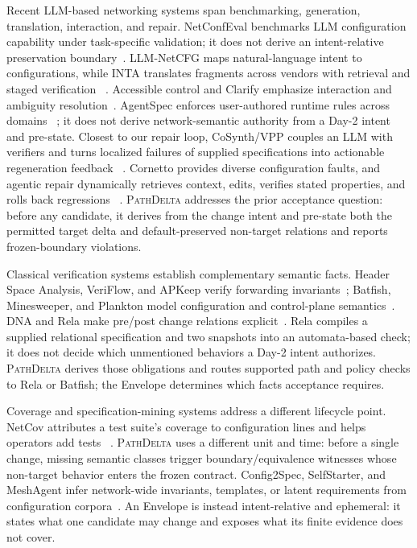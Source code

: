 \documentclass[conference]{IEEEtran}
\newcommand{\system}{\textsc{PathDelta}\xspace}
\begin{document}
Recent LLM-based networking systems span benchmarking, generation, translation,
interaction, and repair.  NetConfEval benchmarks LLM configuration capability
under task-specific validation; it does not derive an intent-relative
preservation boundary~\cite{wang2024netconfeval}.  LLM-NetCFG maps
natural-language intent to configurations, while INTA translates fragments
across vendors with retrieval and staged verification
~\cite{lira2024llmnetcfg,wei2025inta}.  Accessible control and Clarify emphasize
interaction and ambiguity resolution~\cite{lin2025accessible,mondal2025clarify}.
AgentSpec enforces user-authored runtime rules across domains
~\cite{wang2025agentspec}; it does not derive network-semantic authority from a
Day-2 intent and pre-state.  Closest to our
repair loop, CoSynth/VPP couples an LLM with verifiers and turns localized
failures of supplied specifications into actionable regeneration feedback
~\cite{mondal2023router}.  Cornetto provides diverse configuration faults, and
agentic repair dynamically retrieves context, edits, verifies stated
properties, and rolls back regressions
~\cite{protogeros2026cornetto,asadli2026agentic}.
\system addresses the prior acceptance question: before any candidate, it
derives from the change intent and pre-state both the permitted target delta and
default-preserved non-target relations and reports frozen-boundary violations.

Classical verification systems establish complementary semantic facts.  Header
Space Analysis, VeriFlow, and APKeep verify forwarding invariants~\cite{kazemian2012hsa,
khurshid2013veriflow,zhang2020apkeep}; Batfish, Minesweeper, and Plankton model
configuration and control-plane semantics~\cite{fogel2015batfish,
beckett2017minesweeper,prabhu2020plankton,brown2023batfish}.  DNA and Rela make
pre/post change relations explicit~\cite{zhang2022dna,xu2024rela}.  Rela
compiles a supplied relational specification and two snapshots into an
automata-based check; it does not decide which unmentioned behaviors a Day-2
intent authorizes.  \system derives those obligations and routes supported path
and policy checks to Rela or Batfish; the Envelope determines which facts
acceptance requires.

Coverage and specification-mining systems address a different lifecycle point.
NetCov attributes a test suite's coverage to configuration lines and helps operators add tests
~\cite{xu2023netcov}.  \system uses a different unit and time: before a single
change, missing semantic classes trigger boundary/equivalence witnesses whose
non-target behavior enters the frozen contract.  Config2Spec, SelfStarter, and
MeshAgent infer network-wide invariants, templates, or latent requirements from
configuration corpora~\cite{birkner2020config2spec,kakarla2020templates,
zhou2025meshagent}.  An Envelope is instead intent-relative and ephemeral: it
states what one candidate may change and exposes what its finite evidence does
not cover.
\end{document}
